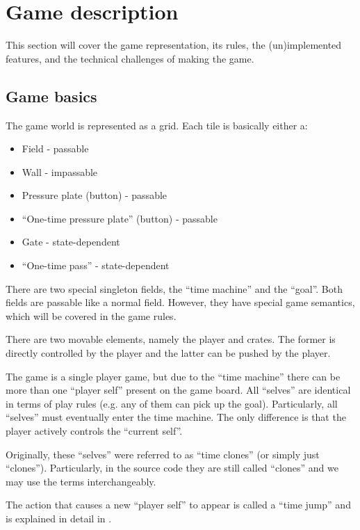 \section{Game description}

This section will cover the game representation, its rules, the
(un)implemented features, and the technical challenges of making the
game.

\subsection{Game basics}
The game world is represented as a grid.  Each tile is basically
either a:

\begin{itemize}
\item Field - passable
\item Wall - impassable
\item Pressure plate (button) - passable
\item ``One-time pressure plate'' (button) - passable
\item Gate - state-dependent
\item ``One-time pass'' - state-dependent
\end{itemize}

There are two special singleton fields, the ``time machine'' and the
``goal''.  Both fields are passable like a normal field.  However,
they have special game semantics, which will be covered in the game
rules.

There are two movable elements, namely the player and crates.  The
former is directly controlled by the player and the latter can be
pushed by the player.

The game is a single player game, but due to the ``time machine''
there can be more than one ``player self'' present on the game board.
All ``selves'' are identical in terms of play rules (e.g. any of
them can pick up the goal).  Particularly, all ``selves'' must
eventually enter the time machine.  The only difference is that the
player actively controls the ``current self''.

Originally, these ``selves'' were referred to as ``time clones'' (or
simply just ``clones'').  Particularly, in the source code they are
still called ``clones'' and we may use the terms interchangeably.

The action that causes a new ``player self'' to appear is called a
``time jump'' and is explained in detail in .

